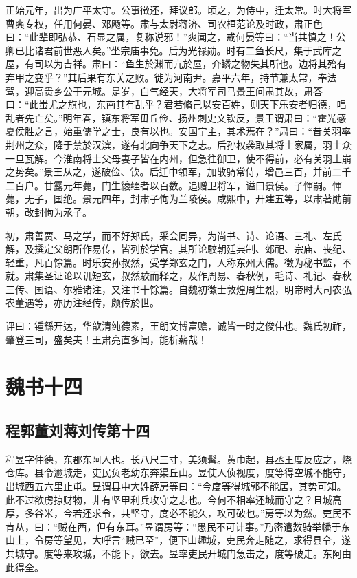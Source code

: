 \documentclass[12pt,UTF8]{ctexbook}
\begin{document}
正始元年，出为广平太守。公事徵还，拜议郎。顷之，为侍中，迁太常。时大将军曹爽专权，任用何晏、邓飏等。肃与太尉蒋济、司农桓范论及时政，肃正色曰：“此辈即弘恭、石显之属，复称说邪！”爽闻之，戒何晏等曰：“当共慎之！公卿已比诸君前世恶人矣。”坐宗庙事免。后为光禄勋。时有二鱼长尺，集于武库之屋，有司以为吉祥。肃曰：“鱼生於渊而亢於屋，介鳞之物失其所也。边将其殆有弃甲之变乎？”其后果有东关之败。徙为河南尹。嘉平六年，持节兼太常，奉法驾，迎高贵乡公于元城。是岁，白气经天，大将军司马景王问肃其故，肃答曰：“此蚩尤之旗也，东南其有乱乎？君若脩己以安百姓，则天下乐安者归德，唱乱者先亡矣。”明年春，镇东将军毌丘俭、扬州刺史文钦反，景王谓肃曰：“霍光感夏侯胜之言，始重儒学之士，良有以也。安国宁主，其术焉在？”肃曰：“昔关羽率荆州之众，降于禁於汉滨，遂有北向争天下之志。后孙权袭取其将士家属，羽士众一旦瓦解。今淮南将士父母妻子皆在内州，但急往御卫，使不得前，必有关羽土崩之势矣。”景王从之，遂破俭、钦。后迁中领军，加散骑常侍，增邑三百，并前二千二百户。甘露元年薨，门生縗绖者以百数。追赠卫将军，谥曰景侯。子惲嗣。惲薨，无子，国绝。景元四年，封肃子恂为兰陵侯。咸熙中，开建五等，以肃著勋前朝，改封恂为氶子。

初，肃善贾、马之学，而不好郑氏，采会同异，为尚书、诗、论语、三礼、左氏解，及撰定父朗所作易传，皆列於学官。其所论駮朝廷典制、郊祀、宗庙、丧纪、轻重，凡百馀篇。时乐安孙叔然，受学郑玄之门，人称东州大儒。徵为秘书监，不就。肃集圣证论以讥短玄，叔然駮而释之，及作周易、春秋例，毛诗、礼记、春秋三传、国语、尔雅诸注，又注书十馀篇。自魏初徵士敦煌周生烈，明帝时大司农弘农董遇等，亦历注经传，颇传於世。

评曰：锺繇开达，华歆清纯德素，王朗文博富赡，诚皆一时之俊伟也。魏氏初祚，肇登三司，盛矣夫！王肃亮直多闻，能析薪哉！

\part{魏书十四}
\chapter{程郭董刘蒋刘传第十四}

程昱字仲德，东郡东阿人也。长八尺三寸，美须髯。黄巾起，县丞王度反应之，烧仓库。县令逾城走，吏民负老幼东奔渠丘山。昱使人侦视度，度等得空城不能守，出城西五六里止屯。昱谓县中大姓薛房等曰：“今度等得城郭不能居，其势可知。此不过欲虏掠财物，非有坚甲利兵攻守之志也。今何不相率还城而守之？且城高厚，多谷米，今若还求令，共坚守，度必不能久，攻可破也。”房等以为然。吏民不肯从，曰：“贼在西，但有东耳。”昱谓房等：“愚民不可计事。”乃密遣数骑举幡于东山上，令房等望见，大呼言“贼已至”，便下山趣城，吏民奔走随之，求得县令，遂共城守。度等来攻城，不能下，欲去。昱率吏民开城门急击之，度等破走。东阿由此得全。
\end{document}
